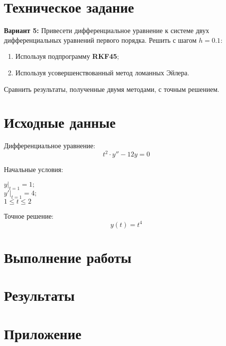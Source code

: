 





\section{Техническое задание}

\textbf{Вариант 5:} Привесети дифференциальное уравнение к системе двух дифференциальных уравнений первого порядка. Решить с шагом $h = 0.1$:
\begin{enumerate}
\item Используя подпрограмму \textbf{RKF45};
\item Используя усовершенствованный метод ломанных Эйлера.
\end{enumerate}
Сравнить результаты, полученные двумя методами, с точным решением.

\section{Исходные данные}

Дифференциальное уравнение:
\[
t^2\cdot y'' - 12y = 0
\]

Начальные условия:
\begin{center}
\begin{multicols}{3} 
	$\left. y \right|_{t=1} = 1;$ \\
	$\left. y' \right|_{t=1} = 4;$ \\
	$1 \le t \le 2$
\end{multicols}
\end{center}

Точное решение:
\[
y(t) = t^4
\]

\section{Выполнение работы}

\section{Результаты}

\section*{Приложение}






